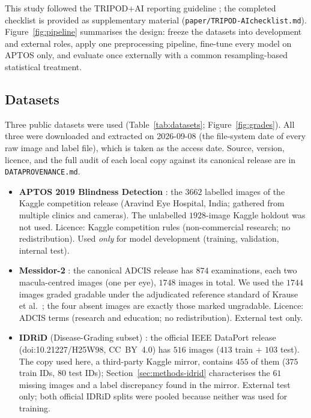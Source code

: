 \documentclass[journal]{IEEEtran}
\renewcommand{\_}{\origunderscore\allowbreak}
\begin{document}
This study followed the TRIPOD+AI reporting guideline \cite{tripodai2024}; the
completed checklist is provided as supplementary material
(\texttt{paper/\allowbreak{}TRIPOD-AI\_checklist.md}). Figure~\ref{fig:pipeline} summarises the
design: freeze the datasets into development and external roles, apply one
preprocessing pipeline, fine-tune every model on APTOS only, and evaluate once
externally with a common resampling-based statistical treatment.

\subsection{Datasets}
\label{sec:methods-data}

Three public datasets were used (Table~\ref{tab:datasets};
Figure~\ref{fig:grades}). All three were downloaded and extracted on
2026-09-08 (the file-system date of every raw image and label file), which is
taken as the access date. Source, version, licence, and the full audit of each
local copy against its canonical release are in \texttt{DATA\_PROVENANCE.md}.

\begin{itemize}
  \item \textbf{APTOS 2019 Blindness Detection} \cite{aptos2019}: the $3662$
    labelled images of the Kaggle competition release (Aravind Eye Hospital,
    India; gathered from multiple clinics and cameras). The unlabelled $1928$-image
    Kaggle holdout was not used. Licence: Kaggle competition rules
    (non-commercial research; no redistribution). Used \emph{only} for model
    development (training, validation, internal test).
  \item \textbf{Messidor-2} \cite{decenciere2014,abramoff2013}: the canonical
    ADCIS release has $874$ examinations, each two macula-centred images (one
    per eye), $1748$ images in total. We used the $1744$ images graded
    gradable under the adjudicated reference standard of Krause et
    al.\ \cite{krause2018}; the four absent images are exactly those marked
    ungradable. Licence: ADCIS terms (research and education; no
    redistribution). External test only.
  \item \textbf{IDRiD} (Disease-Grading subset) \cite{porwal2018,porwal2020}:
    the official IEEE DataPort release (doi:10.21227/H25W98, CC~BY~4.0) has
    $516$ images ($413$ train $+$ $103$ test). The copy used here, a third-party
    Kaggle mirror, contains $455$ of them ($375$ train IDs, $80$ test IDs);
    Section~\ref{sec:methods-idrid} characterises the $61$ missing images and a
    label discrepancy found in the mirror. External test only; both official
    IDRiD splits were pooled because neither was used for training.
\end{itemize}
\end{document}
